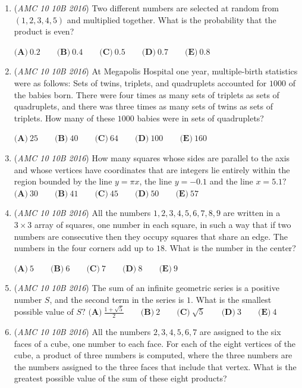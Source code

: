 \begin{enumerate}
	\item (\textit{AMC 10 10B 2016}) Two different numbers are selected at random from $( 1, 2, 3, 4, 5)$ and multiplied together. What is the probability that the product is even?


 $\textbf{(A)}\ 0.2\qquad\textbf{(B)}\ 0.4\qquad\textbf{(C)}\ 0.5\qquad\textbf{(D)}\ 0.7\qquad\textbf{(E)}\ 0.8$


	\item (\textit{AMC 10 10B 2016}) At Megapolis Hospital one year, multiple-birth statistics were as follows: Sets of twins, triplets, and quadruplets accounted for $1000$ of the babies born. There were four times as many sets of triplets as sets of quadruplets, and there was three times as many sets of twins as sets of triplets. How many of these $1000$ babies were in sets of quadruplets?


 $\textbf{(A)}\ 25\qquad\textbf{(B)}\ 40\qquad\textbf{(C)}\ 64\qquad\textbf{(D)}\ 100\qquad\textbf{(E)}\ 160$


	\item (\textit{AMC 10 10B 2016}) How many squares whose sides are parallel to the axis and whose vertices have coordinates that are integers lie entirely within the region bounded by the line $y=\pi x$, the line $y=-0.1$ and the line $x=5.1?$
$\textbf{(A)}\ 30 \qquad \textbf{(B)}\ 41 \qquad \textbf{(C)}\ 45 \qquad \textbf{(D)}\ 50 \qquad \textbf{(E)}\ 57$


	\item (\textit{AMC 10 10B 2016}) All the numbers $1, 2, 3, 4, 5, 6, 7, 8, 9$ are written in a $3\times3$ array of squares, one number in each square, in such a way that if two numbers are consecutive then they occupy squares that share an edge. The numbers in the four corners add up to $18$. What is the number in the center?


 $\textbf{(A)}\ 5\qquad\textbf{(B)}\ 6\qquad\textbf{(C)}\ 7\qquad\textbf{(D)}\ 8\qquad\textbf{(E)}\ 9$


	\item (\textit{AMC 10 10B 2016}) The sum of an infinite geometric series is a positive number $S$, and the second term in the series is $1$. What is the smallest possible value of $S?$
$\textbf{(A)}\ \frac{1+\sqrt{5}}{2} \qquad \textbf{(B)}\ 2 \qquad \textbf{(C)}\ \sqrt{5} \qquad \textbf{(D)}\ 3 \qquad \textbf{(E)}\ 4$


	\item (\textit{AMC 10 10B 2016}) All the numbers $2, 3, 4, 5, 6, 7$ are assigned to the six faces of a cube, one number to each face. For each of the eight vertices of the cube, a product of three numbers is computed, where the three numbers are the numbers assigned to the three faces that include that vertex. What is the greatest possible value of the sum of these eight products?



\end{enumerate}
